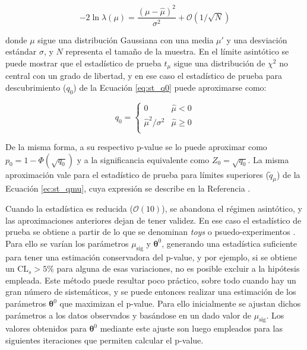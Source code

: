 \begin{equation}
	-2\ln{\lambda(\mu)}=\frac{(\mu-\hat{\mu})^{2}}{\sigma^{2}}+\mathcal{O}(1/\sqrt{N})
\end{equation}

\noindent
donde $\mu$ sigue una distribución Gaussiana con una media $\mu'$ y una desviación estándar $\sigma$, y $N$ representa el tamaño de la muestra. 
En el límite asintótico se puede mostrar que el estadístico de prueba $t_{\mu}$ sigue una distribución de $\chi^{2}$ no central con un grado de libertad, y en ese caso el estadístico de prueba para descubrimiento ($q_{0}$) de la Ecuación \ref{eq:st_q0} puede aproximarse como:

\begin{equation}
	q_{0}=
	\begin{cases}
		0 & \hat{\mu}<0 \\
		\hat{\mu}^{2}/\sigma^{2} & \hat{\mu}\ge 0 \\
	\end{cases}
\end{equation}

De la misma forma, a su respectivo p-value se lo puede aproximar como $p_{0}=1-\Phi(\sqrt{q_{0}})$ y a la significancia equivalente como $Z_{0}=\sqrt{q_{0}}$. La misma aproximación vale para el estadístico de prueba para límites superiores ($\tilde{q}_{\mu}$) de la Ecuación \ref{ec:st_qmu}, cuya expresión se describe en la Referencia \cite{Cowan:2010js}.

Cuando la estadística es reducida ($\mathcal{O}(10)$), se abandona el régimen asintótico, y las aproximaciones anteriores dejan de tener validez. En ese caso el estadístico de prueba se obtiene a partir de lo que se denominan \textit{toys} o psuedo-experimentos \cite{Baak:2014wma}. Para ello se varían los parámetros $\mu_\text{sig}$ y $\bm{\theta}^0$, generando una estadística suficiente para tener una estimación conservadora del p-value, y por ejemplo, si se obtiene un $\text{CL}_{s}>5\%$ para alguna de esas variaciones, no es posible excluir a la hipótesis empleada. Este método puede resultar poco práctico, sobre todo cuando hay un gran número de sistemáticos, y se puede entonces realizar una estimación de los parámetros $\bm{\theta}^0$ que maximizan el p-value. Para ello inicialmente se ajustan dichos parámetros a los datos observados y basándose en un dado valor de $\mu_\text{sig}$. Los valores obtenidos para $\bm{\theta}^0$ mediante este ajuste son luego empleados para las siguientes iteraciones que permiten calcular el p-value.
 



